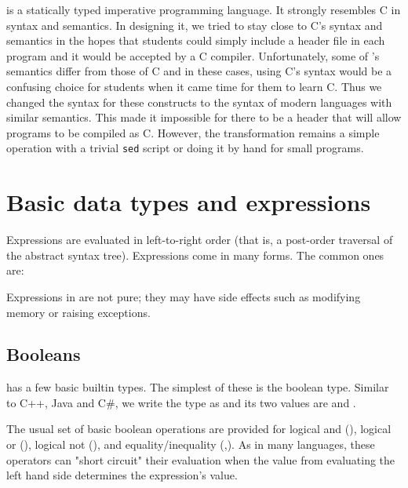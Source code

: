 \langname{} is a statically typed imperative programming language. It strongly
resembles C in syntax and semantics. In designing it, we tried to stay close to
C's syntax and semantics in the hopes that students could simply include a
header file in each \langname{} program and it would be accepted by a C
compiler.  Unfortunately, some of \langname's semantics differ from those of C
and in these cases, using C's syntax would be a confusing choice for students
when it came time for them to learn C. Thus we changed the syntax for these
constructs to the syntax of modern languages with similar semantics. This made
it impossible for there to be a header that will allow \langname{} programs to
be compiled as C.  However, the transformation remains a simple operation with a
trivial {\tt sed} script or doing it by hand for small programs.

\section{Basic data types and expressions}

Expressions are evaluated in left-to-right order (that is, a post-order
traversal of the abstract syntax tree). Expressions come in many forms. The
common ones are:

\grammarbegin
\grmexprcommon
\grammarend

Expressions in \langname{} are not pure; they may have side effects such as
modifying memory or raising exceptions.

\subsection{Booleans}
\langname{} has a few basic builtin types. The simplest of these is the boolean
type. Similar to C++, Java and C\#, we write the type as  and its
two values are  and .

\grammarbegin
\grmboolconst


\grammarend


The usual set of basic boolean operations are provided for logical and
(\langtext{\&\&}), logical or (\langtext{\|\|}), logical not (\langtext{!}), and
equality/inequality (\langtext{==},\langtext{!=}). As in many languages, these
operators can "short circuit" their evaluation when the value from evaluating
the left hand side determines the expression's value.

